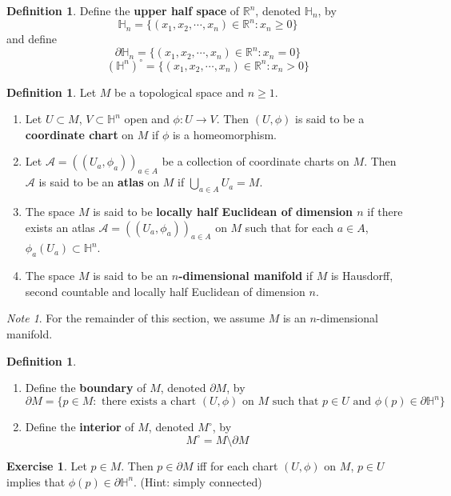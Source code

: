 \documentclass[12pt]{amsart}
\theoremstyle{definition}
\newtheorem{defn}[definition]{Definition}
\theoremstyle{remark}
\newtheorem{note}[remark]{Note}
\theoremstyle{definition}
\newtheorem{ex}[definition]{Exercise}
\renewcommand{\H}{\mathbb{H}}
\newcommand{\R}{\mathbb{R}}
\newcommand{\MA}{\mathcal{A}}
\begin{document}
	\begin{defn}
		Define the \textbf{upper half space} of $\R^n$, denoted $\H_n$, by $$\H_n = \{(x_1, x_2, \cdots, x_n) \in \R^n: x_n \geq 0\}$$ and define $$\partial\H_n = \{(x_1, x_2, \cdots, x_n) \in \R^n: x_n = 0\}$$ 
		$$(\H^n)^{\circ} = \{(x_1, x_2, \cdots, x_n) \in \R^n: x_n > 0\}$$
	\end{defn}
	
	\begin{defn}
		Let $M$ be a topological space and $n \geq 1$.
		\begin{enumerate}
			\item Let $U \subset M$, $V \subset \H^n$ open and $\phi:U \rightarrow V$. Then $(U, \phi)$ is said to be a \textbf{coordinate chart} on $M$ if $\phi$ is a homeomorphism. 
			\item Let $\MA = ((U_a,\phi_{a}))_{a \in A}$ be a collection of coordinate charts on $M$. Then $\MA$ is said to be an \textbf{atlas} on $M$ if  $\bigcup\limits_{a \in A} U_a = M$.
			\item The space $M$ is said to be \textbf{locally half Euclidean of dimension $n$} if there exists an atlas $\MA = ((U_a,\phi_{a}))_{a \in A}$ on $M$ such that for each $a \in A$, $\phi_a(U_a) \subset \H^n$.
			\item The space $M$ is said to be an \textbf{$n$-dimensional manifold} if $M$ is Hausdorff, second countable and locally half Euclidean of dimension $n$. 
		\end{enumerate}
	\end{defn}

	\begin{note}
		For the remainder of this section, we assume $M$ is an $n$-dimensional manifold.
	\end{note}

	\begin{defn}\
		\begin{enumerate}
			\item Define the 
			\textbf{boundary} of $M$, denoted $\partial M$, by $$\partial M = \{p \in M: \text{ there exists a chart } (U, \phi) \text{ on } M \text{ such that } p \in U \text{ and } \phi(p) \in \partial \H^n\}$$
			\item Define the 
			\textbf{interior} of $M$, denoted $M^{\circ}$, by $$M^{\circ} = M \setminus \partial M$$
		\end{enumerate}
	\end{defn}

	\begin{ex}
		Let $p \in M$. Then $p \in \partial M$ iff for each chart $(U, \phi)$ on $M$, $p \in U$ implies that $\phi(p) \in \partial \H^n$. (Hint: simply connected)
	\end{ex}
\end{document}
